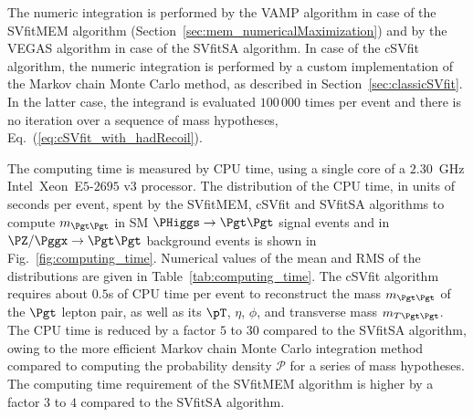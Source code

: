 The numeric integration is performed by the VAMP algorithm in case of
the SVfitMEM algorithm (\cf Section~\ref{sec:mem_numericalMaximization}) and by the VEGAS algorithm
in case of the SVfitSA algorithm.
In case of the cSVfit algorithm, the numeric integration is performed
by a custom implementation of the Markov chain Monte Carlo method, as described in Section~\ref{sec:classicSVfit}.
In the latter case, the integrand is evaluated $100\,000$ times per event and there is no
iteration over a sequence of mass hypotheses, \cf Eq.~(\ref{eq:cSVfit_with_hadRecoil}).

The computing time is measured by CPU time, 
using a single core of a $2.30$~GHz Intel\TReg~Xeon\TReg~E$5$-$2695$ v$3$ processor.
The distribution of the CPU time, in units of seconds per event, 
spent by the SVfitMEM, cSVfit and SVfitSA algorithms
to compute $m_{\Pgt\Pgt}$ in SM $\PHiggs \to \Pgt\Pgt$ signal events and in $\PZ/\Pggx \to \Pgt\Pgt$ background events
is shown in Fig.~\ref{fig:computing_time}.
Numerical values of the mean and RMS of the distributions are given in Table~\ref{tab:computing_time}.
The cSVfit algorithm requires about $0.5$s of CPU time per event to reconstruct the mass $m_{\Pgt\Pgt}$ of the $\Pgt$ lepton pair,
as well as its $\pT$, $\eta$, $\phi$, and transverse mass $m_{T\Pgt\Pgt}$.
The CPU time is reduced by a factor $5$ to $30$ compared to the SVfitSA algorithm, 
owing to the more efficient Markov chain Monte
Carlo integration method compared to
computing the probability density $\mathcal{P}$
for a series of mass hypotheses.
The computing time requirement of the SVfitMEM algorithm is higher by a factor $3$ to $4$ compared to the SVfitSA algorithm.

